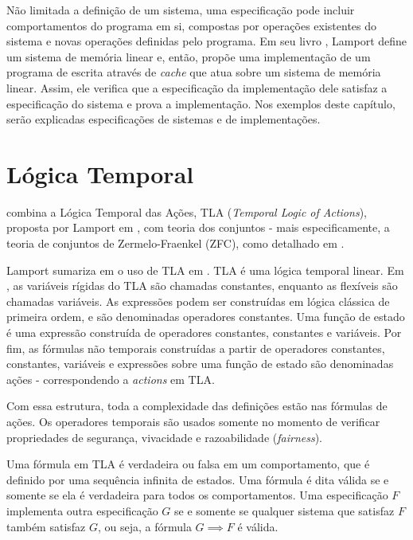 Não limitada a definição de um sistema, uma especificação pode incluir comportamentos do programa em si, compostas por operações existentes do sistema e novas operações definidas pelo programa. Em seu livro \cite{specifying-systems}, Lamport define um sistema de memória linear e, então, propõe uma implementação de um programa de escrita através de \textit{cache} que atua sobre um sistema de memória linear. Assim, ele verifica que a especificação da implementação dele satisfaz a especificação do sistema e prova a implementação. Nos exemplos deste capítulo, serão explicadas especificações de sistemas e de implementações.

\section{Lógica Temporal}

\TLA combina a Lógica Temporal das Ações, TLA (\textit{Temporal Logic of Actions}), proposta por Lamport em \cite{tlaformalization}, com teoria dos conjuntos - mais especificamente, a teoria de conjuntos de Zermelo-Fraenkel (ZFC), como detalhado em \cite{merzlogic}.

Lamport sumariza em \cite{proofsystem} o uso de TLA em \TLA. TLA é uma lógica temporal linear. Em \TLA, as variáveis rígidas do TLA são chamadas constantes, enquanto as flexíveis são chamadas variáveis. As expressões podem ser construídas em lógica clássica de primeira ordem, e são denominadas operadores constantes. Uma função de estado é uma expressão construída de operadores constantes, constantes e variáveis. Por fim, as fórmulas não temporais construídas a partir de operadores constantes, constantes, variáveis e expressões sobre uma função de estado são denominadas ações - correspondendo a \textit{actions} em TLA.

Com essa estrutura, toda a complexidade das definições estão nas fórmulas de ações. Os operadores temporais são usados somente no momento de verificar propriedades de segurança, vivacidade e razoabilidade (\textit{fairness}).

Uma fórmula em TLA é verdadeira ou falsa em um comportamento, que é definido por uma sequência infinita de estados. Uma fórmula é dita válida se e somente se ela é verdadeira para todos os comportamentos. Uma especificação $F$ implementa outra especificação $G$ se e somente se qualquer sistema que satisfaz $F$ também satisfaz $G$, ou seja, a fórmula $G \implies F$ é válida.

